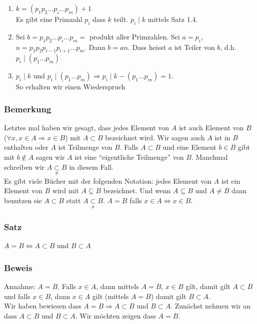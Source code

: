 \begin{enumerate}
\item $k=\left( p_1 p_2\dots p_i \dots p_m \right)+1$\\
Es gibt eine Primzahl $p_i$ dass $k$ teilt. $p_i\mid k$ mittels Satz 1.4.
\item Sei $b=p_1 p_2\dots p_i \dots p_m=$ produkt aller Primzahlen. Sei $a=p_i$, $n=p_1 p_2 p_{i-1} p_{i+1} \dots p_m$. Dann $b=an$. Dass heisst $a$ ist Teiler von $b$, d.h. $p_i\mid\left(p_1\dots p_m\right)$
\item $p_i\mid k$ und $p_i\mid \left(p_1\dots p_m\right) \Rightarrow p_i \mid k-\left(p_1\dots p_m\right)=1$.\\
So erhalten wir einen Wiederspruch
\end{enumerate}

\subsubsection*{Bemerkung}
Letztes mal haben wir gesagt, dass jedes Element von $A$ ist auch Element von $B$ ($\forall x,x\in A\Rightarrow x\in B$) mit $A\subset B$ bezeichnet wird. Wir sagen auch $A$ ist in $B$ enthalten oder $A$ ist Teilmenge von $B$. Falls $A\subset B$ und eine Element $b\in B$ gibt mit $b\not\in A$ sagen wir $A$ ist eine ``eigentliche Teilmenge'' von $B$. Manchmal schreiben wir $A\mathop  \subset \limits_{\not  = } B$ in diesem Fall. \\

Es gibt viele Bücher mit der folgenden Notation: jedes Element von $A$ ist ein Element von $B$ wird mit $A\subseteq B$ bezeichnet. Und wenn $A\subseteq B$ und $A\not =B$ dann benutzen sie $A\subset B$ statt $A\mathop  \subset \limits_{\not  = } B$. $A=B$ falls $x\in A\Leftrightarrow x\in B$. 

\subsubsection*{Satz}
$A=B \Leftrightarrow A\subset B$ und $B\subset A$ 
\subsubsection*{Beweis}
Annahme: $A=B$. Falls $x\in A$, dann mittels $A=B$, $x\in B$ gilt, damit gilt $A\subset B$ und falls $x\in B$, dann $x\in A$ gilt (mittels $A=B$) damit gilt $B\subset A$.\\

Wir haben bewiesen dass $A=B \Rightarrow A\subset B \text{ und } B\subset A$. Zunächst nehmen wir an dass $A\subset B$ und $B\subset A$. Wir möchten zeigen dass $A=B$. \\

